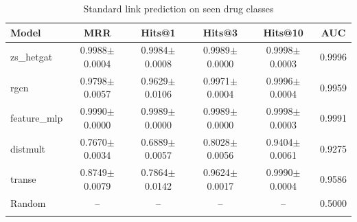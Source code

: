 \begin{table}[t]
\centering
\caption{Standard link prediction on seen drug classes}
\label{tab:standard}
\begin{tabular}{lccccc}
\toprule
\textbf{Model} & \textbf{MRR} & \textbf{Hits@1} & \textbf{Hits@3} & \textbf{Hits@10} & \textbf{AUC} \\
\midrule
zs\_hetgat & 0.9988$\pm$0.0004 & 0.9984$\pm$0.0008 & 0.9989$\pm$0.0000 & 0.9998$\pm$0.0003 & 0.9996 \\
rgcn & 0.9798$\pm$0.0057 & 0.9629$\pm$0.0106 & 0.9971$\pm$0.0004 & 0.9996$\pm$0.0004 & 0.9959 \\
feature\_mlp & 0.9990$\pm$0.0000 & 0.9989$\pm$0.0000 & 0.9989$\pm$0.0000 & 0.9998$\pm$0.0003 & 0.9991 \\
distmult & 0.7670$\pm$0.0034 & 0.6889$\pm$0.0057 & 0.8028$\pm$0.0056 & 0.9404$\pm$0.0061 & 0.9275 \\
transe & 0.8749$\pm$0.0079 & 0.7864$\pm$0.0142 & 0.9624$\pm$0.0017 & 0.9990$\pm$0.0004 & 0.9586 \\
Random & -- & -- & -- & -- & 0.5000 \\ \\
\bottomrule
\end{tabular}
\end{table}
